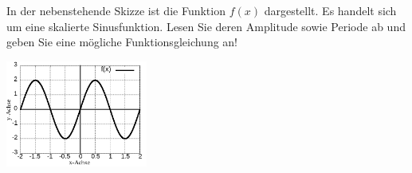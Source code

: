 \item 

\begin{multicols}{2}

In der nebenstehende Skizze ist die Funktion $f(x)$ dargestellt. Es handelt sich um eine skalierte Sinusfunktion. Lesen Sie deren Amplitude sowie Periode ab und geben Sie eine mögliche Funktionsgleichung an!

\columnbreak

\includegraphics[width=0.35\textwidth]{../tex-snippets/ex-graph-read-1-img-a.png}

\end{multicols}



